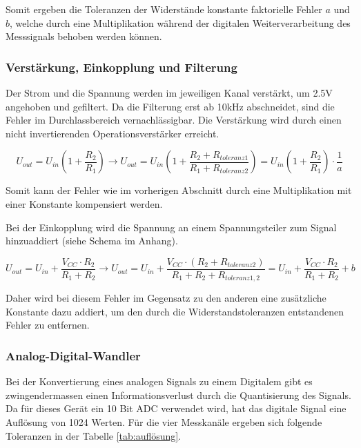 Somit ergeben die Toleranzen der Widerstände konstante faktorielle Fehler $a$ und $b$, welche durch eine Multiplikation während der digitalen Weiterverarbeitung des Messsignals behoben werden können.





\subsubsection*{Verstärkung, Einkopplung und Filterung}
Der Strom und die Spannung werden im jeweiligen Kanal verstärkt, um 2.5V angehoben und gefiltert. Da die Filterung erst ab 10kHz abschneidet, sind die Fehler im Durchlassbereich vernachlässigbar. Die Verstärkung wird durch einen nicht invertierenden Operationsverstärker erreicht.

\begin{equation}
U_{out} = U_{in} \left( 1+\frac{R_2}{R_1} \right) \to U_{out} = U_{in} \left( 1+\frac{R_2+R_{toleranz1}}{R_1+R_{toleranz2}} \right) = U_{in}\left(1+\frac{R_2}{R_1}\right) \cdot \frac{1}{a}
\end{equation}

Somit kann der Fehler wie im vorherigen Abschnitt durch eine Multiplikation mit einer Konstante kompensiert werden.

Bei der Einkopplung wird die Spannung an einem Spannungsteiler zum Signal hinzuaddiert (siehe Schema im Anhang).

\begin{equation}
U_{out} = U_{in} + \frac{V_{CC} \cdot R_2}{R_1+R_2} \to U_{out} = U_{in} + \frac{V_{CC} \cdot (R_2 + R_{toleranz2})}{R_1+R_2 + R_{toleranz1,2}} =  U_{in} + \frac{V_{CC} \cdot R_2}{R_1+R_2} + b
\end{equation}

Daher wird bei diesem Fehler im Gegensatz zu den anderen eine zusätzliche Konstante dazu addiert, um den durch die Widerstandstoleranzen entstandenen Fehler zu entfernen.
 
\subsubsection*{Analog-Digital-Wandler}
Bei der Konvertierung eines analogen Signals zu einem Digitalem gibt es zwingendermassen einen Informationsverlust durch die Quantisierung des Signals. Da für dieses Gerät ein 10 Bit ADC verwendet wird, hat das digitale Signal eine Auflösung von 1024 Werten. Für die vier Messkanäle ergeben sich folgende Toleranzen in der Tabelle \ref{tab:auflösung}.


